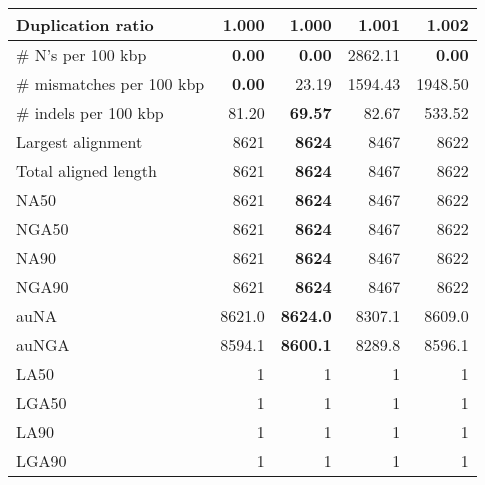 \documentclass[12pt,a4paper]{article}
\begin{document}
\begin{table}[ht]
\begin{center}
\begin{tabular}{|l*{4}{|r}|}
Duplication ratio & {\bf 1.000} & {\bf 1.000} & 1.001 & 1.002 \\ \hline
\# N's per 100 kbp & {\bf 0.00} & {\bf 0.00} & 2862.11 & {\bf 0.00} \\ \hline
\# mismatches per 100 kbp & {\bf 0.00} & 23.19 & 1594.43 & 1948.50 \\ \hline
\# indels per 100 kbp & 81.20 & {\bf 69.57} & 82.67 & 533.52 \\ \hline
Largest alignment & 8621 & {\bf 8624} & 8467 & 8622 \\ \hline
Total aligned length & 8621 & {\bf 8624} & 8467 & 8622 \\ \hline
NA50 & 8621 & {\bf 8624} & 8467 & 8622 \\ \hline
NGA50 & 8621 & {\bf 8624} & 8467 & 8622 \\ \hline
NA90 & 8621 & {\bf 8624} & 8467 & 8622 \\ \hline
NGA90 & 8621 & {\bf 8624} & 8467 & 8622 \\ \hline
auNA & 8621.0 & {\bf 8624.0} & 8307.1 & 8609.0 \\ \hline
auNGA & 8594.1 & {\bf 8600.1} & 8289.8 & 8596.1 \\ \hline
LA50 & 1 & 1 & 1 & 1 \\ \hline
LGA50 & 1 & 1 & 1 & 1 \\ \hline
LA90 & 1 & 1 & 1 & 1 \\ \hline
LGA90 & 1 & 1 & 1 & 1 \\ \hline
\end{tabular}
\end{center}
\end{table}
\end{document}
